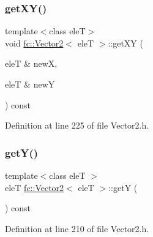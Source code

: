 \subsubsection{\texorpdfstring{get\+X\+Y()}{getXY()}}
{\footnotesize\ttfamily template$<$class eleT$>$ \\
void \hyperlink{classfc_1_1Vector2}{fc\+::\+Vector2}$<$ eleT $>$\+::get\+XY (\begin{DoxyParamCaption}\item[{eleT \&}]{newX,  }\item[{eleT \&}]{newY }\end{DoxyParamCaption}) const}



Definition at line 225 of file Vector2.\+h.

\mbox{\label{classfc_1_1Vector2_a4f187c16fe4d3260ea890ff17f67d853}} 
\subsubsection{\texorpdfstring{get\+Y()}{getY()}}
{\footnotesize\ttfamily template$<$class eleT $>$ \\
eleT \hyperlink{classfc_1_1Vector2}{fc\+::\+Vector2}$<$ eleT $>$\+::getY (\begin{DoxyParamCaption}{ }\end{DoxyParamCaption}) const}



Definition at line 210 of file Vector2.\+h.

